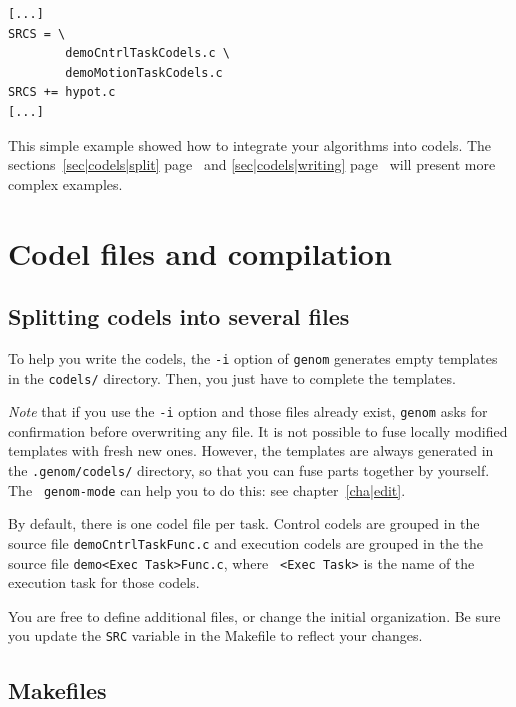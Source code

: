 \begin{center}\begin{cartouche}\small\begin{verbatim}
[...]
SRCS = \
        demoCntrlTaskCodels.c \
        demoMotionTaskCodels.c
SRCS += hypot.c
[...]
\end{verbatim}\end{cartouche}\end{center}

This simple example showed how to integrate  your algorithms into codels.
The sections~\ref{sec|codels|split} page~\pageref{sec|codels|split} and
\ref{sec|codels|writing} page~\pageref{sec|codels|writing} will present
more complex examples.


\section{Codel files and compilation}

\subsection{Splitting codels into several files}

To help you   write the  codels, the {\tt   -i}  option of  {\tt   genom}
generates empty templates in the {\tt  codels/} directory. Then, you just
have to complete the templates.

{\em Note}  that if you use the  {\tt -i} option  and those files already
exist, {\tt genom} asks for confirmation before  overwriting any file. It
is not possible to  fuse locally modified  templates with fresh new ones.
However, the   templates are always generated  in  the  {\tt .genom/codels/}
directory, so  that  you can fuse   parts together by  yourself. The {\tt
genom-mode} can help you to do this: see chapter~\ref{cha|edit}.

By default, there is one codel file per task.  Control codels are grouped
in the  source file  {\tt demoCntrlTaskFunc.c}  and execution  codels are
grouped  in the the source  file {\tt demo<Exec  Task>Func.c}, where {\tt
<Exec Task>} is the name of the execution task for those codels.

You are    free  to define   additional  files,  or  change  the  initial
organization.  Be sure you update the  {\tt SRC} variable in the Makefile
to reflect your changes.


\subsection{Makefiles}

